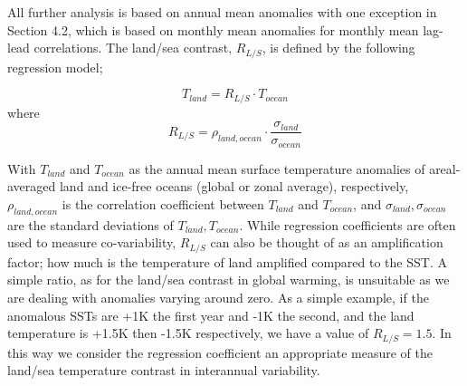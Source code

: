 All further analysis is based on annual mean anomalies with one exception in 
Section 4.2, which is based on monthly mean anomalies for monthly mean lag-lead
correlations. The land/sea contrast, $R_{L/S}$, is defined by the following 
regression model;

\begin{equation}
T_{land} = R_{L/S} \cdot T_{ocean}
\end{equation}
where
\begin{equation}
	R_{L/S} = \rho_{land,ocean}\cdot \frac{\sigma_{land}}{\sigma_{ocean}}
\end{equation}

With $T_{land}$ and $T_{ocean}$ as the annual mean surface temperature anomalies 
of areal-averaged land and ice-free oceans (global or zonal average), 
respectively, $\rho_{land,ocean}$ is the correlation coefficient between 
$T_{land}$ and $T_{ocean}$, and $\sigma_{land}, \sigma_{ocean}$ are the standard 
deviations of $T_{land}, T_{ocean}$. While regression coefficients are often 
used to measure co-variability, $R_{L/S}$ can also be thought of as an 
amplification factor; how much is the temperature of land amplified compared to 
the SST. A simple ratio, as for the land/sea contrast in global warming, is 
unsuitable as we are dealing with anomalies varying around zero. As a simple 
example, if the anomalous SSTs are +1K the first year and -1K the second, and 
the land temperature is +1.5K then -1.5K respectively, we have a value of 
$R_{L/S} = 1.5$. In this way we consider the regression coefficient an 
appropriate measure of the land/sea temperature contrast in interannual 
variability.
